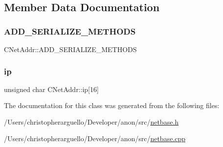 \subsection{Member Data Documentation}
\mbox{\label{class_c_net_addr_ab08e22719f96b42c61e998158a895e5f}} 
\subsubsection{\texorpdfstring{A\+D\+D\+\_\+\+S\+E\+R\+I\+A\+L\+I\+Z\+E\+\_\+\+M\+E\+T\+H\+O\+DS}{ADD\_SERIALIZE\_METHODS}}
{\footnotesize\ttfamily C\+Net\+Addr\+::\+A\+D\+D\+\_\+\+S\+E\+R\+I\+A\+L\+I\+Z\+E\+\_\+\+M\+E\+T\+H\+O\+DS}

\mbox{\label{class_c_net_addr_acff7ce68f33f8dfbfe6d79d80928d417}} 
\subsubsection{\texorpdfstring{ip}{ip}}
{\footnotesize\ttfamily unsigned char C\+Net\+Addr\+::ip\mbox{[}16\mbox{]}\hspace{0.3cm}{\ttfamily [protected]}}



The documentation for this class was generated from the following files\+:\begin{DoxyCompactItemize}
\item 
/\+Users/christopherarguello/\+Developer/anon/src/\mbox{\hyperlink{netbase_8h}{netbase.\+h}}\item 
/\+Users/christopherarguello/\+Developer/anon/src/\mbox{\hyperlink{netbase_8cpp}{netbase.\+cpp}}\end{DoxyCompactItemize}
